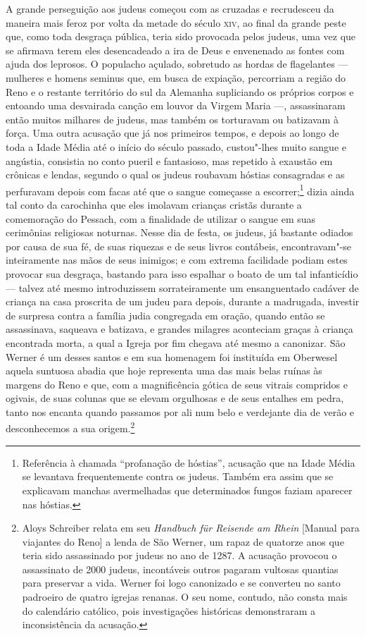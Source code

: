 A grande perseguição aos judeus começou com as cruzadas e recrudesceu da
maneira mais feroz por volta da metade do século \textsc{xiv}, ao final da
grande peste que, como toda desgraça pública, teria sido provocada
pelos judeus, uma vez que se afirmava terem eles desencadeado a ira de
Deus e envenenado as fontes com ajuda dos leprosos. O populacho
açulado, sobretudo as hordas de flagelantes --- mulheres e homens seminus
que, em busca de expiação, percorriam a região do Reno e o restante
território do sul da Alemanha supliciando os próprios corpos e entoando
uma desvairada canção em louvor da Virgem Maria ---, assassinaram então
muitos milhares de judeus, mas também os torturavam ou batizavam à
força. Uma outra acusação que já nos primeiros tempos, e depois ao
longo de toda a Idade Média até o início do século passado,
custou"-lhes muito sangue e angústia, consistia no conto pueril e
fantasioso, mas repetido à exaustão em crônicas e lendas, segundo o
qual os judeus roubavam hóstias consagradas e as perfuravam depois com
facas até que o sangue começasse a
escorrer;\footnote{ Referência à chamada ``profanação de hóstias'', acusação que na Idade
Média se levantava frequentemente contra os judeus. Também era assim
que se explicavam manchas avermelhadas que determinados fungos faziam
aparecer nas hóstias.}
dizia ainda tal conto da carochinha que eles imolavam crianças cristãs
durante a comemoração do Pessach, com a finalidade de utilizar o sangue
em suas cerimônias religiosas noturnas. Nesse dia de festa, os judeus,
já bastante odiados por causa de sua fé, de suas riquezas e de seus
livros contábeis, encontravam"-se inteiramente nas mãos de seus
inimigos; e com extrema facilidade podiam estes provocar sua desgraça,
bastando para isso espalhar o boato de um tal infanticídio --- talvez até
mesmo introduzissem sorrateiramente um ensanguentado cadáver de criança
na casa proscrita de um judeu para depois, durante a madrugada,
investir de surpresa contra a família judia congregada em oração,
quando então se assassinava, saqueava e batizava, e grandes milagres
aconteciam graças à criança encontrada morta, a qual a Igreja por fim
chegava até mesmo a canonizar. São Werner é um desses santos e em sua
homenagem foi instituída em Oberwesel aquela suntuosa abadia que hoje
representa uma das mais belas ruínas às margens do Reno e que, com a
magnificência gótica de seus vitrais compridos e ogivais, de suas
colunas que se elevam orgulhosas e de seus entalhes em pedra, tanto nos
encanta quando passamos por ali num belo e verdejante dia de verão e
desconhecemos a sua
origem.\footnote{ Aloys
Schreiber relata em seu \textit{Handbuch für Reisende am Rhein} [Manual
para viajantes do Reno] a lenda de São Werner, um rapaz de quatorze
anos que teria sido assassinado por judeus no ano de 1287. A acusação
provocou o assassinato de 2000 judeus, incontáveis outros pagaram
vultosas quantias para preservar a vida. Werner foi logo canonizado e
se converteu no santo padroeiro de quatro igrejas renanas. O seu nome,
contudo, não consta mais do calendário católico, pois investigações
históricas demonstraram a inconsistência da acusação.}
